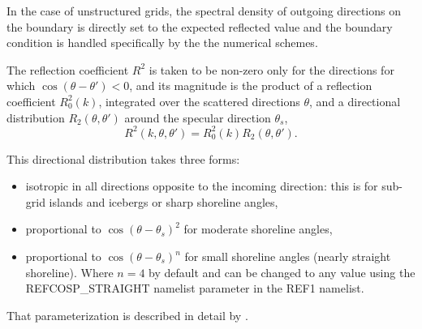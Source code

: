 In the case of unstructured grids, the spectral density of outgoing directions
on the boundary is directly set to the expected reflected value and the
boundary condition is handled specifically by the the numerical schemes.

The reflection coefficient $R^2$ is taken to be non-zero only for the
directions for which $\cos(\theta-\theta')<0$, and its magnitude is the
product of a reflection coefficient $R_0^2(k)$, integrated over the scattered
directions $\theta$, and a directional distribution $R_2(\theta,\theta')$
around the specular direction $\theta_s$,
\begin{equation} 
R^2(k,\theta,\theta')  =  R_0^2(k) R_2(\theta,\theta').
\end{equation}

This directional distribution takes three forms: 
\begin{itemize}

\item isotropic in all directions opposite to the incoming direction: this is
      for sub-grid islands and icebergs or sharp shoreline angles, 

\item proportional to $\cos(\theta-\theta_s)^2$ for moderate shoreline angles,

\item proportional to $\cos(\theta-\theta_s)^n$ for small shoreline angles
      (nearly straight shoreline). Where $n=4$ by default and can be changed
      to any value using the REFCOSP\_STRAIGHT namelist parameter in the REF1
      namelist.

\end{itemize}

\noindent
That parameterization is described in detail by \cite{art:AR12}.
